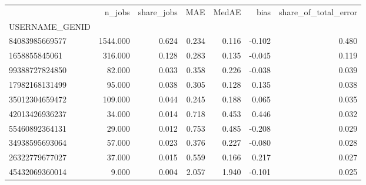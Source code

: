 \begin{tabular}{lrrrrrr}
\toprule
 & n_jobs & share_jobs & MAE & MedAE & bias & share_of_total_error \\
USERNAME_GENID &  &  &  &  &  &  \\
\midrule
84083985669577 & 1544.000 & 0.624 & 0.234 & 0.116 & -0.102 & 0.480 \\
1658855845061 & 316.000 & 0.128 & 0.283 & 0.135 & -0.045 & 0.119 \\
99388727824850 & 82.000 & 0.033 & 0.358 & 0.226 & -0.038 & 0.039 \\
17982168131499 & 95.000 & 0.038 & 0.305 & 0.128 & 0.135 & 0.038 \\
35012304659472 & 109.000 & 0.044 & 0.245 & 0.188 & 0.065 & 0.035 \\
42013426936237 & 34.000 & 0.014 & 0.718 & 0.453 & 0.446 & 0.032 \\
55460892364131 & 29.000 & 0.012 & 0.753 & 0.485 & -0.208 & 0.029 \\
34938595693064 & 57.000 & 0.023 & 0.376 & 0.227 & -0.080 & 0.028 \\
26322779677027 & 37.000 & 0.015 & 0.559 & 0.166 & 0.217 & 0.027 \\
45432069360014 & 9.000 & 0.004 & 2.057 & 1.940 & -0.101 & 0.025 \\
\bottomrule
\end{tabular}
